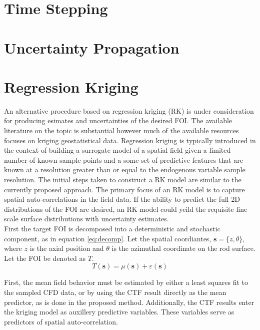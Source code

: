 \section{Time Stepping}

\section{Uncertainty Propagation}

\section{Regression Kriging}

An alternative procedure based on regression kriging (RK) is under consideration for producing esimates and uncertainties of the desired FOI.
The available literature on the topic is substantial however much of the available resources focuses on kriging geostatistical data.  Regression kriging is typically introduced in the context of building
a surrogate model of a spatial field given a limited number of known sample points and a some set of predictive features that are known at a resolution greater than or equal to the endogenous variable sample resolution.
The initial steps taken to construct a RK model are similar to the currently proposed approach.  The primary focus of an RK model is to capture spatial auto-correlations in the field data.   If the ability to predict the full 2D distributions of the FOI are desired, an RK model could yeild the requisite fine scale surface distributions with uncertainty estimates. \\

First the target FOI is decomposed into a deterministic and stochastic component, as in equation \ref{eq:decomp}.
Let the spatial coordiantes, $\mathbf{s} = \{z, \theta\}$,
where $z$ is the axial position and $\theta$ is the azimuthal coordinate on the rod surface. Let the FOI be denoted as $T$.
\begin{equation}
T(\mathbf s) = \mu(\mathbf s) + \varepsilon(\mathbf s)
\label{eq:decomp}
\end{equation}

First, the mean field behavior must be estimated by either a least squares fit to the sampled CFD data, or by using the CTF result directly as the mean predictor, as is done in the proposed method. 
Additionally, the CTF results enter the kriging model as auxillery predictive variables.  These variables serve as predictors of spatial auto-correlation.

